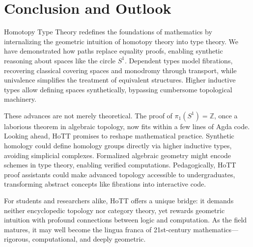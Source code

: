 \section{Conclusion and Outlook}\label{sec:conc}

Homotopy Type Theory redefines the foundations of mathematics by internalizing the geometric intuition of homotopy theory into type theory. We have demonstrated how paths replace equality proofs, enabling synthetic reasoning about spaces like the circle \(S^1\). Dependent types model fibrations, recovering classical covering spaces and monodromy through transport, while univalence simplifies the treatment of equivalent structures. Higher inductive types allow defining spaces synthetically, bypassing cumbersome topological machinery.  

These advances are not merely theoretical. The proof of \(\pi_1(S^1) = \mathbb{Z}\), once a laborious theorem in algebraic topology, now fits within a few lines of Agda code. Looking ahead, HoTT promises to reshape mathematical practice. Synthetic homology could define homology groups directly via higher inductive types, avoiding simplicial complexes. Formalized algebraic geometry might encode schemes in type theory, enabling verified computations. Pedagogically, HoTT proof assistants could make advanced topology accessible to undergraduates, transforming abstract concepts like fibrations into interactive code.  

For students and researchers alike, HoTT offers a unique bridge: it demands neither encyclopedic topology nor category theory, yet rewards geometric intuition with profound connections between logic and computation. As the field matures, it may well become the lingua franca of 21st-century mathematics—rigorous, computational, and deeply geometric.  